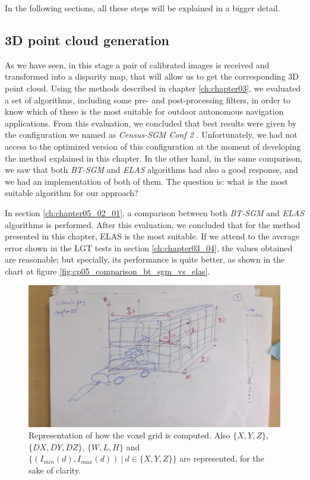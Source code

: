 In the following sections, all these steps will be explained in a bigger detail.

\subsection{3D point cloud generation}\label{ch:chapter05_01_01}

As we have seen, in this stage a pair of calibrated images is received and transformed into a disparity map, that will allow us to get the corresponding 3D point cloud. Using the methods described in chapter \ref{ch:chapter03}, we evaluated a set of algorithms, including some pre- and post-processing filters, in order to know which of these is the most suitable for outdoor autonomous navigation applications. From this evaluation, we concluded that best results were given by the configuration we named as \emph{Census-SGM Conf 2} \citep{Hirschmuller2005}. Unfortunately, we had not access to the optimized version of this configuration at the moment of developing the method explained in this chapter. In the other hand, in the same comparison, we saw that both \emph{BT-SGM} and \emph{ELAS} algorithms had also a good response, and we had an implementation of both of them. The question is: what is the most suitable algorithm for our approach? 

In section \ref{ch:chapter05_02_01}, a comparison between both \emph{BT-SGM} and \emph{ELAS} algorithms is performed. After this evaluation, we concluded that for the method presented in this chapter, ELAS is the most suitable. If we attend to the average error shown in the \ac{LGT} tests in section \ref{ch:chapter03_04}, the values obtained are reasonable; but specially, its performance is quite better, as shown in the chart at figure \ref{fig:cp05_comparison_bt_sgm_vs_elas}.

\begin{figure}[h!]
        \centering
        \includegraphics[width=\textwidth]{intervals}
        \caption{Representation of how the voxel grid is computed. Also $\{X, Y, Z\}$, $\{DX, DY, DZ\}$, $\{W, L, H\}$ and $\{(I_{min}(d), I_{max}(d)) ~|~ d \in \{X, Y, Z\}\}$ are represented, for the sake of clarity.}\label{fig:cp05_intervals}
\end{figure}

